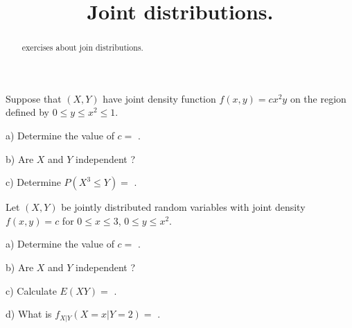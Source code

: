 \documentclass{ximera}
\title{Joint distributions.}
\begin{document}
\begin{abstract}
exercises about join distributions.
\end{abstract}
\maketitle

Suppose that $(X,Y)$ have joint density function $f(x,y)=cx^{2}y$ on the region defined by $0\leq y \leq x^{2} \leq 1$.

\begin{question}
     \begin{solution}
     a) Determine the value of $c =$ .
     \end{solution}
\end{question}

\begin{question} 
     \begin{solution}
          b) Are $X$ and $Y$ independent ?
          \begin{multiple-choice}
          \end{multiple-choice} 
     \end{solution}
\end{question}

\begin{question}
     \begin{solution}
          c) Determine $P(X^{3}\leq Y) =$  .
     \end{solution}
\end{question}

Let $(X,Y)$ be jointly distributed random variables with joint density $f(x,y)=c$ for $0\leq x \leq 3$, $0\leq y \leq x^{2}$.

\begin{question}
     \begin{solution}
     a) Determine the value of $c =$ .
     \end{solution}
\end{question}

\begin{question} 
     \begin{solution}
          b) Are $X$ and $Y$ independent ?
          \begin{multiple-choice}
          \end{multiple-choice}
     \end{solution}
\end{question}

\begin{question}
     \begin{solution}
          c) Calculate $E(XY) =$ .
     \end{solution}
\end{question}

\begin{question}
     \begin{solution}
          d) What is $f_{X\vert Y}(X=x\vert Y=2) =$ .
     \end{solution}
\end{question}
\end{document}
